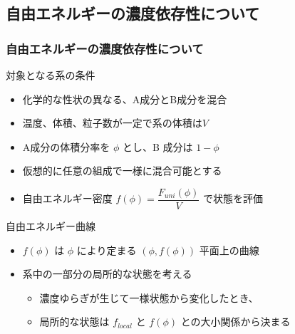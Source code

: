 \documentclass[unicode,12pt]{beamer}%
\begin{document}
\subsection{自由エネルギーの濃度依存性について}
\begin{frame}
	\frametitle{自由エネルギーの濃度依存性について}
		\vspace{-3mm}
		\begin{block}{対象となる系の条件}
			\begin{itemize}
				\item 化学的な性状の異なる、A成分とB成分を混合
				\item 温度、体積、粒子数が一定で系の体積は$V$
				\item A成分の体積分率を $\phi$ とし、B 成分は $1-\phi$
				\item \alert{仮想的に任意の組成で一様に混合可能}とする
				\item 自由エネルギー密度 $f(\phi)=\dfrac{F_{uni}(\phi)}{V}$ で状態を評価
			\end{itemize}
		\end{block}
		\vspace{-3mm}
		\begin{alertblock}{自由エネルギー曲線}
			\begin{itemize}
				\item $f(\phi)$ は $\phi$ により定まる $(\phi, f(\phi) )$ 平面上の曲線
				\item 系中の一部分の局所的な状態を考える
				\begin{itemize}
					\item 濃度ゆらぎが生じて一様状態から変化したとき、
					\item 局所的な状態は $f_{local}$ と $f(\phi)$ との大小関係から決まる
				\end{itemize}
			\end{itemize}
		\end{alertblock}
\end{frame}
\end{document}
